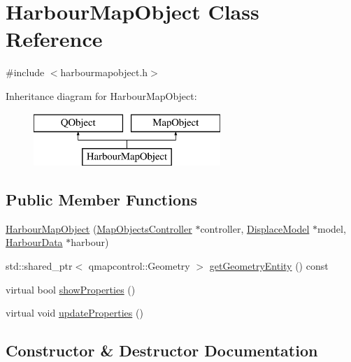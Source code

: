 \hypertarget{class_harbour_map_object}{}\section{Harbour\+Map\+Object Class Reference}
\label{class_harbour_map_object}


{\ttfamily \#include $<$harbourmapobject.\+h$>$}

Inheritance diagram for Harbour\+Map\+Object\+:\begin{figure}[H]
\begin{center}
\leavevmode
\includegraphics[height=2.000000cm]{da/da3/class_harbour_map_object}
\end{center}
\end{figure}
\subsection*{Public Member Functions}
\begin{DoxyCompactItemize}
\item 
\mbox{\hyperlink{class_harbour_map_object_ad76c10541c875baccd862cd1fa3b05e7}{Harbour\+Map\+Object}} (\mbox{\hyperlink{class_map_objects_controller}{Map\+Objects\+Controller}} $\ast$controller, \mbox{\hyperlink{class_displace_model}{Displace\+Model}} $\ast$model, \mbox{\hyperlink{class_harbour_data}{Harbour\+Data}} $\ast$harbour)
\item 
std\+::shared\+\_\+ptr$<$ qmapcontrol\+::\+Geometry $>$ \mbox{\hyperlink{class_harbour_map_object_aa0429983795942fbf7143c081d679e0a}{get\+Geometry\+Entity}} () const
\item 
virtual bool \mbox{\hyperlink{class_harbour_map_object_a65c4f99a5a68bd4dc7dda0b49b18adac}{show\+Properties}} ()
\item 
virtual void \mbox{\hyperlink{class_harbour_map_object_acffca3c0eb5fdd53e440dad3263d2b5c}{update\+Properties}} ()
\end{DoxyCompactItemize}


\subsection{Constructor \& Destructor Documentation}
\mbox{\label{class_harbour_map_object_ad76c10541c875baccd862cd1fa3b05e7}} 
